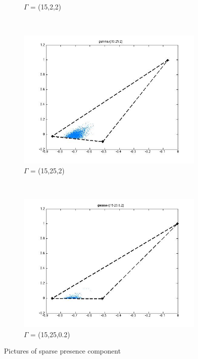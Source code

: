 \documentclass[14pt]{book}
\begin{document}
\begin{figure}
\begin{subfigure}[b]{0.3\textwidth}
                \caption{$\Gamma$ = (15,2,2) }
                \label{fig:gull}
        \end{subfigure}%
        ~ %
        \begin{subfigure}[b]{0.3\textwidth}
                \centering
                \includegraphics[width=\textwidth]{(15,25,2).jpg}
                \caption{$\Gamma$ = (15,25,2)}
                \label{fig:tiger}
        \end{subfigure}
        ~ %
        \begin{subfigure}[b]{0.3\textwidth}
                \centering
                \includegraphics[width=\textwidth]{(15,25,0).jpg}
                \caption{$\Gamma$ = (15,25,0.2)}
                \label{fig:mouse}
        \end{subfigure}
        \caption{Pictures of sparse presence component }\label{fig:animals}
\end{figure}
\end{document}
